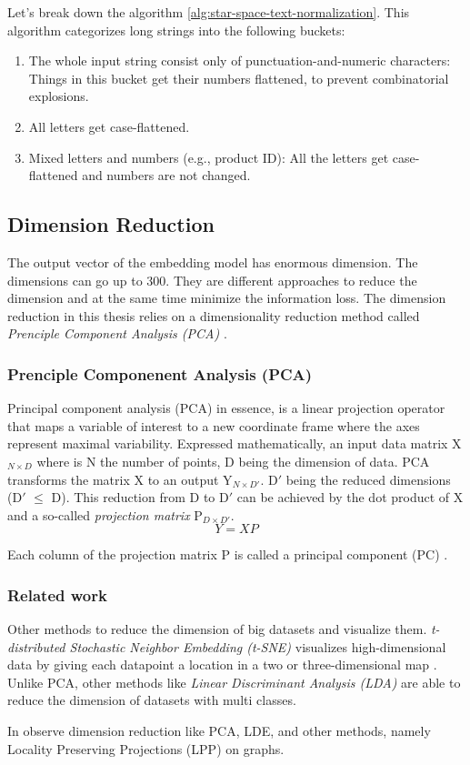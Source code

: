 Let's break down the algorithm \ref{alg:star-space-text-normalization}. This algorithm categorizes long strings into the following buckets:

\begin{enumerate}
	\item The whole input string consist only of punctuation-and-numeric characters: Things in this bucket get their numbers flattened, to prevent combinatorial explosions.
	\item All letters get case-flattened.
	\item Mixed letters and numbers (e.g., product ID): All the letters get case-flattened and numbers are not changed.
\end{enumerate}

\subsection{Dimension Reduction}
\label{subsec:dimension-reduction}
The output vector of the embedding model has enormous dimension. The dimensions can go up to 300. They are different approaches to reduce the dimension and at the same time minimize the information loss. The dimension reduction in this thesis relies on a dimensionality reduction method called \emph{Prenciple Component Analysis (PCA)} \cite{wold1987principal}.

\subsubsection{Prenciple Componenent Analysis (PCA)}
\label{subsubsec:pca}
Principal component analysis (PCA) in essence, is a linear projection operator that maps a variable of interest to a new coordinate frame where the axes represent maximal variability. Expressed mathematically, an input data matrix X$_{N \times D}$ where is N the number of points, D being the dimension of data. PCA transforms the matrix X to an output Y$_{N \times D\prime}$. D$\prime$ being the reduced dimensions (D$\prime$ $\leq$ D). This reduction from D to D$\prime$ can be achieved by the dot product of X and a so-called \emph{projection matrix} P$_{D \times D\prime}$.
	\begin{equation}
		\label{PCA}
		Y = XP
	\end{equation}

Each column of the projection matrix P is called a principal component (PC) \cite{projectionMatrix}. 


\subsubsection{Related work}
\label{subsubsec:dimension-reduction-related-work}
Other methods to reduce the dimension of big datasets and visualize them. \emph{t-distributed Stochastic Neighbor Embedding (t-SNE)} visualizes high-dimensional data by giving each datapoint a location in a two or three-dimensional map \cite{van2008visualizing}. Unlike PCA, other methods like \emph{Linear Discriminant Analysis (LDA)} \cite{balakrishnama1998linear} are able to reduce the dimension of datasets with multi classes.


In \cite{yan2006graph} observe dimension reduction like PCA, LDE, and other methods, namely Locality Preserving Projections (LPP) on graphs.


